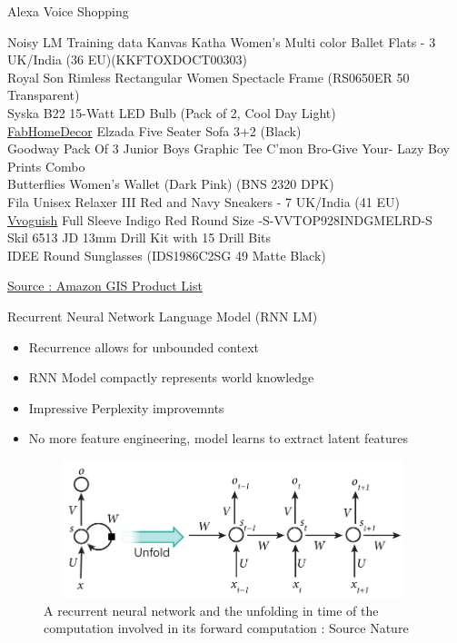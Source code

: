 \documentclass{beamer}
\begin{document}
\begin{frame}{Alexa Voice Shopping}
	\begin{block}{Noisy LM Training data}
		Kanvas Katha Women's Multi color Ballet Flats - 3 UK/India (36 EU)(KKFTOXDOCT00303) \\
		Royal Son Rimless Rectangular Women Spectacle Frame (RS0650ER 50 Transparent) \\
		Syska B22 15-Watt LED Bulb (Pack of 2, Cool Day Light) \\
		\underline{FabHomeDecor} Elzada Five Seater Sofa 3+2 (Black) \\
		Goodway Pack Of 3 Junior Boys Graphic Tee C'mon Bro-Give Your- Lazy Boy Prints Combo \\
		Butterflies Women's Wallet (Dark Pink) (BNS 2320 DPK) \\
		Fila Unisex Relaxer III Red and Navy Sneakers - 7 UK/India (41 EU) \\
		\underline{Vvoguish} Full Sleeve Indigo Red Round Size -S-VVTOP928INDGMELRD-S \\
		Skil 6513 JD 13mm Drill Kit with 15 Drill Bits \\
		IDEE Round Sunglasses (IDS1986C2SG 49 Matte Black)
	\end{block}

	\href{www.amazon.in}{Source : Amazon GIS Product List}
\end{frame}


\begin{frame}{Recurrent Neural Network Language Model (RNN LM)}
	\begin{itemize}
		\item Recurrence allows for unbounded context
		\item RNN Model compactly represents world knowledge
		\item Impressive Perplexity improvemnts
		\item No more feature engineering, model learns to extract latent features
	\end{itemize}

	\begin{figure}
	   \includegraphics[width=11cm, height=4cm]{figs/rnn_unfloding.jpg}
	   \caption{A recurrent neural network and the unfolding in time of the computation involved in its forward computation : Source Nature}
	\end{figure}
\end{frame}
\end{document}

